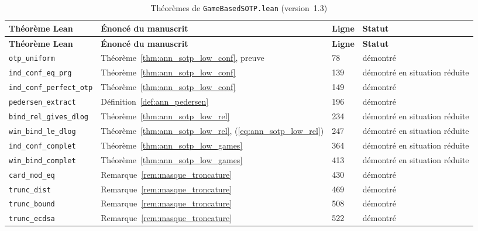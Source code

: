 {\footnotesize
\begin{longtable}{@{}p{4.6cm}>{\raggedright\arraybackslash}p{4.9cm}p{0.9cm}>{\raggedright\arraybackslash}p{4cm}@{}}
\caption{Th\'eor\`emes de \texttt{GameBasedSOTP.lean} (version~1.3)}\label{tab:ann_g_mecanisation}\\
\toprule
\textbf{Th\'eor\`eme Lean} & \textbf{\'Enonc\'e du manuscrit} & \textbf{Ligne} & \textbf{Statut} \\
\midrule
\endfirsthead
\toprule
\textbf{Th\'eor\`eme Lean} & \textbf{\'Enonc\'e du manuscrit} & \textbf{Ligne} & \textbf{Statut} \\
\midrule
\endhead
\bottomrule
\endfoot
\texttt{otp\_\allowbreak{}uniform} & Théorème~\ref{thm:ann_sotp_low_conf}, preuve & 78 & démontré \\
\texttt{ind\_\allowbreak{}conf\_\allowbreak{}eq\_\allowbreak{}prg} & Théorème~\ref{thm:ann_sotp_low_conf} & 139 & démontré en situation réduite \\
\texttt{ind\_\allowbreak{}conf\_\allowbreak{}perfect\_\allowbreak{}otp} & Théorème~\ref{thm:ann_sotp_low_conf} & 149 & démontré \\
\texttt{pedersen\_\allowbreak{}extract} & Définition~\ref{def:ann_pedersen} & 196 & démontré \\
\texttt{bind\_\allowbreak{}rel\_\allowbreak{}gives\_\allowbreak{}dlog} & Théorème~\ref{thm:ann_sotp_low_rel} & 234 & démontré en situation réduite \\
\texttt{win\_\allowbreak{}bind\_\allowbreak{}le\_\allowbreak{}dlog} & Théorème~\ref{thm:ann_sotp_low_rel}, (\ref{eq:ann_sotp_low_rel}) & 247 & démontré en situation réduite \\
\texttt{ind\_\allowbreak{}conf\_\allowbreak{}complet} & Théorème~\ref{thm:ann_sotp_low_games} & 364 & démontré en situation réduite \\
\texttt{win\_\allowbreak{}bind\_\allowbreak{}complet} & Théorème~\ref{thm:ann_sotp_low_games} & 413 & démontré en situation réduite \\
\texttt{card\_\allowbreak{}mod\_\allowbreak{}eq} & Remarque~\ref{rem:masque_troncature} & 430 & démontré \\
\texttt{trunc\_\allowbreak{}dist} & Remarque~\ref{rem:masque_troncature} & 469 & démontré \\
\texttt{trunc\_\allowbreak{}bound} & Remarque~\ref{rem:masque_troncature} & 508 & démontré \\
\texttt{trunc\_\allowbreak{}ecdsa} & Remarque~\ref{rem:masque_troncature} & 522 & démontré \\

\end{longtable}}
